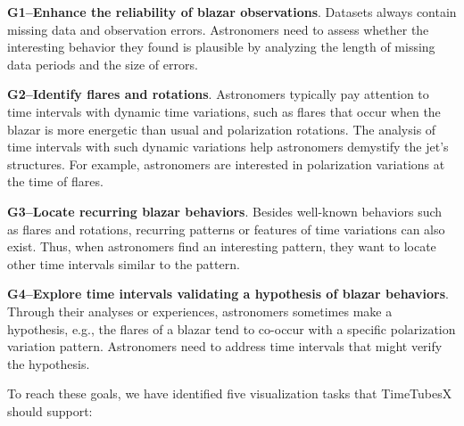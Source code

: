 \noindent\textbf{G1--Enhance the reliability of blazar observations}. 
Datasets always contain missing data and observation errors. 
Astronomers need to assess whether the interesting behavior they found is plausible by analyzing the length of missing data periods and the size of errors.

\noindent\textbf{G2--Identify flares and rotations}. 
Astronomers typically pay attention to time intervals with dynamic time variations, %
such as flares that occur when the blazar is more energetic than usual and polarization rotations. %
The analysis of time intervals with such dynamic variations help astronomers demystify the jet's structures.
For example, astronomers are interested in polarization variations at the time of flares.

\noindent\textbf{G3--Locate recurring blazar behaviors}.
Besides well-known behaviors such as flares and rotations, 
recurring patterns or features of time variations can also exist.
Thus, when astronomers find an interesting pattern, 
they want to locate other time intervals similar to the pattern.

\noindent\textbf{G4--Explore time intervals validating a hypothesis of blazar behaviors}.
Through their analyses or experiences, astronomers sometimes make a hypothesis, e.g., the flares of a blazar tend to co-occur with a specific polarization variation pattern. 
Astronomers need to address time intervals that might verify the hypothesis.


To reach these goals, we have identified five visualization tasks that TimeTubesX should support:

